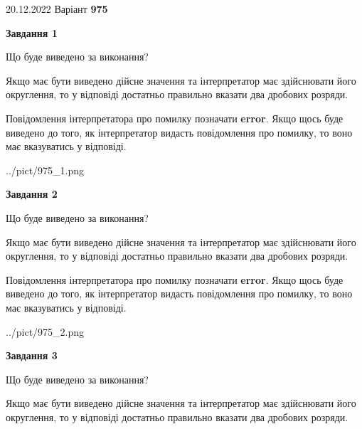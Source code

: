 \documentclass[12pt, ukrainian]{article}
\begin{document}
{20.12.2022 Варіант \No \textbf { 975 }\par}
{
\begin {Large}

{\begin {center}\textbf{Завдання 1}\end {center}}\par
Що буде виведено за виконання? \par

Якщо має бути виведено дійсне значення та інтерпретатор має здійснювати його округлення, 
то у відповіді достатньо правильно вказати два дробових розряди.

Повідомлення інтерпретатора про помилку позначати \textbf{error}.
Якщо щось буде виведено до того, як інтерпретатор видасть повідомлення про помилку, 
то воно має вказуватись у відповіді. \par

\begin{center}
	{../pict/975_1.png}
\end{center}
\newpage

{\begin {center}\textbf{Завдання 2}\end {center}}\par
Що буде виведено за виконання? \par

Якщо має бути виведено дійсне значення та інтерпретатор має здійснювати його округлення, 
то у відповіді достатньо правильно вказати два дробових розряди.

Повідомлення інтерпретатора про помилку позначати \textbf{error}.
Якщо щось буде виведено до того, як інтерпретатор видасть повідомлення про помилку, 
то воно має вказуватись у відповіді. \par

\begin{center}
	{../pict/975_2.png}
\end{center}
\newpage

{\begin {center}\textbf{Завдання 3}\end {center}}\par
Що буде виведено за виконання? \par

Якщо має бути виведено дійсне значення та інтерпретатор має здійснювати його округлення, 
то у відповіді достатньо правильно вказати два дробових розряди.


\end{Large}}
\end{document}
